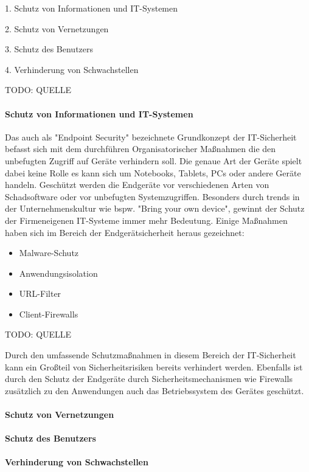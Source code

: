 \begin{description}
    \item 1. Schutz von Informationen und IT-Systemen
    \item 2. Schutz von Vernetzungen
    \item 3. Schutz des Benutzers
    \item 4. Verhinderung von Schwachstellen
\end{description}
TODO: QUELLE

\paragraph{Schutz von Informationen und IT-Systemen}

Das auch als "Endpoint Security" bezeichnete Grundkonzept der IT-Sicherheit befasst sich mit dem durchführen 
Organisatorischer Maßnahmen die den unbefugten Zugriff auf Geräte verhindern soll. 
Die genaue Art der Geräte spielt dabei keine Rolle es kann sich um Notebooks, Tablets, PCs oder andere Geräte handeln. 
Geschützt werden die Endgeräte vor verschiedenen Arten von Schadsoftware oder vor unbefugten Systemzugriffen. 
Besonders durch trends in der Unternehmenskultur wie bspw. "Bring your own device", gewinnt der Schutz der Firmeneigenen 
IT-Systeme immer mehr Bedeutung. 
Einige Maßnahmen haben sich im Bereich der Endgerätsicherheit heraus gezeichnet: 

\begin{itemize}
    \item Malware-Schutz
    \item Anwendungsisolation
    \item URL-Filter
    \item Client-Firewalls
\end{itemize}
TODO: QUELLE

Durch den umfassende Schutzmaßnahmen in diesem Bereich der IT-Sicherheit kann ein Großteil von Sicherheitsrisiken bereits 
verhindert werden. Ebenfalls ist durch den Schutz der Endgeräte durch Sicherheitsmechanismen wie Firewalls zusätzlich zu den 
Anwendungen auch das Betriebssystem des Gerätes geschützt. 

\paragraph{Schutz von Vernetzungen}



\paragraph{Schutz des Benutzers}

\paragraph{Verhinderung von Schwachstellen}